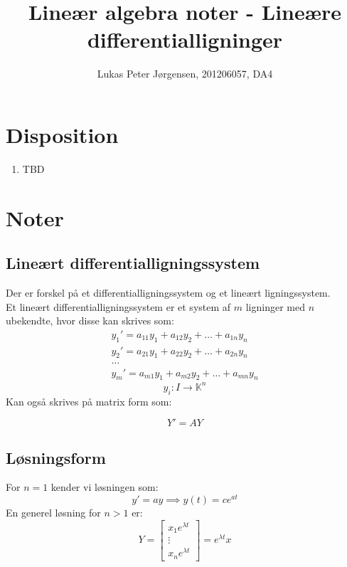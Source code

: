 \documentclass[a4paper,oneside,article]{memoir}
\begin{document}
    \title{Lineær algebra noter - Lineære differentialligninger}
    \author{Lukas Peter Jørgensen, 201206057, DA4
            }
    \maketitle
    
    \tableofcontents
        
    \chapter{Disposition}
    \begin{enumerate}
    \item TBD
    \end{enumerate}
    
	\chapter{Noter}
	
	\section{Lineært differentialligningssystem}
	Der er forskel på et differentialligningssystem 
	og et lineært ligningssystem.\\
	Et lineært differentialligningssystem er et system 
	af $m$ ligninger med $n$ ubekendte, hvor disse kan 
	skrives som:
	\begin{align*}
	y_1'=a_{11}y_1+a_{12}y_2+\dots + a_{1n}y_n\\
	y_2'=a_{21}y_1+a_{22}y_2+\dots + a_{2n}y_n\\
	\dots\\
	y_m'=a_{m1}y_1+a_{m2}y_2+\dots + a_{mn}y_n
	\end{align*}
	$$y_i:I\rightarrow \mathbb{K}^n$$
	Kan også skrives på matrix form som:
	
	\begin{equation}
	Y'=AY
	\end{equation}
	
	\section{Løsningsform}
	For $n=1$ kender vi løsningen som:
	$$y'=ay\implies y(t)=ce^{at}$$
	En generel løsning for $n>1$ er:
	$$Y=\begin{bmatrix}
	x_1e^{\lambda t}\\
	\vdots\\
	x_ne^{\lambda t}
	\end{bmatrix}=e^{\lambda t}x$$
	
\end{document}
